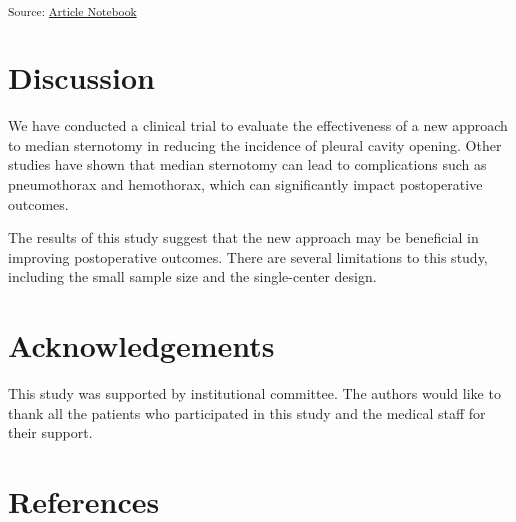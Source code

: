 \documentclass[
  number]{elsarticle}
\begin{document}
\textsubscript{Source:
\href{https://raffdoc.github.io/manuscript-template/index.qmd.html}{Article
Notebook}}

\section{Discussion}\label{discussion}

We have conducted a clinical trial to evaluate the effectiveness of a
new approach to median sternotomy in reducing the incidence of pleural
cavity opening. Other studies have shown that median sternotomy can lead
to complications such as pneumothorax and hemothorax, which can
significantly impact postoperative outcomes\citep{gullu2009}.

The results of this study suggest that the new approach may be
beneficial in improving postoperative outcomes. There are several
limitations to this study, including the small sample size and the
single-center design.

\section{Acknowledgements}\label{acknowledgements}

This study was supported by institutional committee. The authors would
like to thank all the patients who participated in this study and the
medical staff for their support.

\section*{References}\label{references}

\renewcommand{\bibsection}{}

\end{document}
